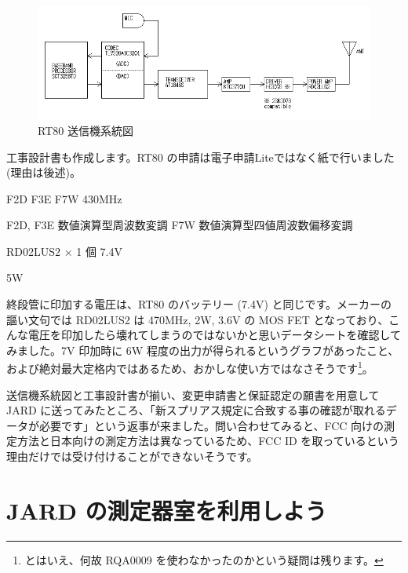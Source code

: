 \documentclass[a4j,oneside]{ujbook}
\begin{document}
\begin{figure}[H]
 \centering
 \includegraphics[width=15cm]{img/rt80-2.png}
 \caption{RT80 送信機系統図}
\end{figure}

工事設計書も作成します。RT80 の申請は電子申請Liteではなく紙で行いました (理由は後述)。
\begin{description}[style=nextline]
 \item[発射可能な電波の形式及び周波数の範囲] F2D F3E F7W 430MHz 
 \item[変調方式] F2D, F3E 数値演算型周波数変調 \newline
   F7W 数値演算型四値周波数偏移変調 
 \item[終段管 (名称×個数・電圧)] RD02LUS2 × 1 個 7.4V 
 \item[定格出力] 5W
\end{description}
終段管に印加する電圧は、RT80 のバッテリー (7.4V) と同じです。メーカーの謳い文句では RD02LUS2 は 470MHz, 2W, 3.6V の MOS FET となっており、こんな電圧を印加したら壊れてしまうのではないかと思いデータシートを確認してみました。7V 印加時に 6W 程度の出力が得られるというグラフがあったこと、および絶対最大定格内ではあるため、おかしな使い方ではなさそうです\footnote{とはいえ、何故 RQA0009 を使わなかったのかという疑問は残ります。}。

送信機系統図と工事設計書が揃い、変更申請書と保証認定の願書を用意して JARD に送ってみたところ、「新スプリアス規定に合致する事の確認が取れるデータが必要です」という返事が来ました。問い合わせてみると、FCC 向けの測定方法と日本向けの測定方法は異なっているため、FCC ID を取っているという理由だけでは受け付けることができないそうです。

\section{JARD の測定器室を利用しよう}
\end{document}
